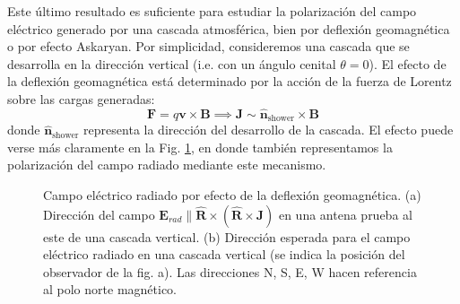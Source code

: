 \documentclass[12 pt, a4paper]{article} %
\numberwithin{equation}{section}
\numberwithin{figure}{section}
\newcommand{\vect}[1]{\boldsymbol{\mathbf{#1}}}
\begin{document}
Este último resultado es suficiente para estudiar la polarización del campo eléctrico generado por una cascada atmosférica, bien por deflexión geomagnética o por efecto Askaryan. Por simplicidad, consideremos una cascada que se desarrolla en la dirección vertical (i.e. con un ángulo cenital $\theta=0$). El efecto de la deflexión geomagnética está determinado por la acción de la fuerza de Lorentz sobre las cargas generadas:
\begin{equation}
	\vect{F}=q\vect{v}\times \vect{B}\implies \vect{J}\sim \hat{\vect{n}}_{\text{shower}}\times\vect{B}\label{ec38}
\end{equation}
donde $\hat{\vect{n}}_{\text{shower}}$ representa la dirección del desarrollo de la cascada. El efecto puede verse más claramente en la Fig. \ref{Geomag_deflexion}, en donde también representamos la polarización del campo radiado mediante este mecanismo.

\newpage
\begin{figure}[H]
	\centering
	\hspace{10mm}
	\caption{Campo eléctrico radiado por efecto de la deflexión geomagnética. (a) Dirección del campo $\vect{E}_{rad}\parallel  \hat{\vect{R}}\times\left(\hat{\vect{R}}\times\vect{J}\right)$ en una antena prueba al este de una cascada vertical. (b) Dirección esperada para el campo eléctrico radiado en una cascada vertical (se indica la posición del observador de la fig. a). Las direcciones N, S, E, W hacen referencia al polo norte magnético.}
	\label{Geomag_deflexion}
\end{figure}
\end{document}
